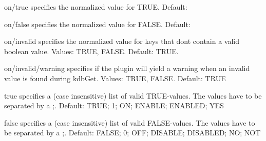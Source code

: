 \begin{DoxyItemize}
\item {\ttfamily on/true} specifies the normalized value for {\ttfamily T\+R\+UE}. Default\+: {}
\item {\ttfamily on/false} specifies the normalized value for {\ttfamily F\+A\+L\+SE}. Default\+: {}
\item {\ttfamily on/invalid} specifies the normalized value for keys that don\textquotesingle{}t contain a valid boolean value. Values\+: {\ttfamily T\+R\+UE}, {\ttfamily F\+A\+L\+SE}. Default\+: {\ttfamily T\+R\+UE}.
\item {\ttfamily on/invalid/warning} specifies if the plugin will yield a warning when an invalid value is found during kdb\+Get. Values\+: {\ttfamily T\+R\+UE}, {\ttfamily F\+A\+L\+SE}. Default\+: {\ttfamily T\+R\+UE}
\item {\ttfamily true} specifies a (case insensitive) list of valid {\ttfamily T\+R\+UE}-\/values. The values have to be separated by a {\ttfamily ;}. Default\+: {\ttfamily T\+R\+UE; 1; ON; E\+N\+A\+B\+LE; E\+N\+A\+B\+L\+ED; Y\+ES}
\item {\ttfamily false} specifies a (case insensitive) list of valid {\ttfamily F\+A\+L\+SE}-\/values. The values have to be separated by a {\ttfamily ;}. Default\+: {\ttfamily F\+A\+L\+SE; 0; O\+FF; D\+I\+S\+A\+B\+LE; D\+I\+S\+A\+B\+L\+ED; NO; N\+OT} 
\end{DoxyItemize}